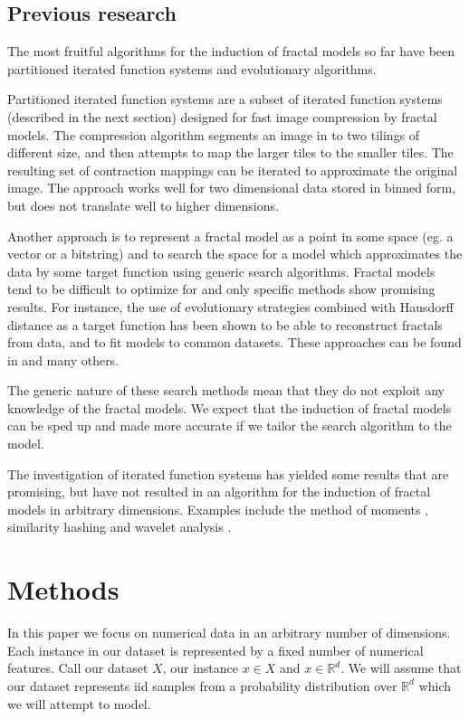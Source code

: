\documentclass[10pt,a4paper,oneside]{article}
\theoremstyle{definition}
\begin{document}
\subsection*{Previous research}

The most fruitful algorithms for the induction of fractal models so far have been partitioned iterated function systems and evolutionary algorithms. 

Partitioned iterated function systems \cite{hart1996fractal} are a subset of iterated function systems (described in the next section) designed for fast image compression by fractal models. The compression algorithm segments an image in to two tilings of different size, and then attempts to map the larger tiles to the smaller tiles. The resulting set of contraction mappings can be iterated to approximate the original image. The approach works well for two dimensional data stored in binned form, but does not translate well to higher dimensions.

Another approach is to represent a fractal model as a point in some space (eg. a vector or a bitstring) and to search the space for a model which approximates the data by some target function using generic search algorithms. Fractal models tend to be difficult to optimize for and only specific methods show promising results. For instance, the use of evolutionary strategies combined with Hausdorff distance as a target function has been shown to be able to reconstruct fractals from data, and to fit models to common datasets. These approaches can be found in \cite{bloem2010fractal,nettleton1994evolutionary} and many others.

The generic nature of these search methods mean that they do not exploit any knowledge of the fractal models. We expect that the induction of fractal models can be sped up and made more accurate if we tailor the search algorithm to the model.

The investigation of iterated function systems has yielded some results that are promising, but have not resulted in an algorithm for the induction of fractal models in arbitrary dimensions. Examples include the method of moments \cite{rinaldo1994inverse}, similarity hashing \cite{hart1997similarity} and wavelet analysis \cite{struzik1996coastline}.

\section*{Methods}

In this paper we focus on numerical data in an arbitrary number of dimensions. Each instance in our dataset is represented by a fixed number of numerical features. Call our dataset $X$, our instance $x \in X$ and $x \in {\mathbb R}^d$. We will assume that our dataset represents iid samples from a probability distribution over ${\mathbb R}^d$ which we will attempt to model.
\end{document}
